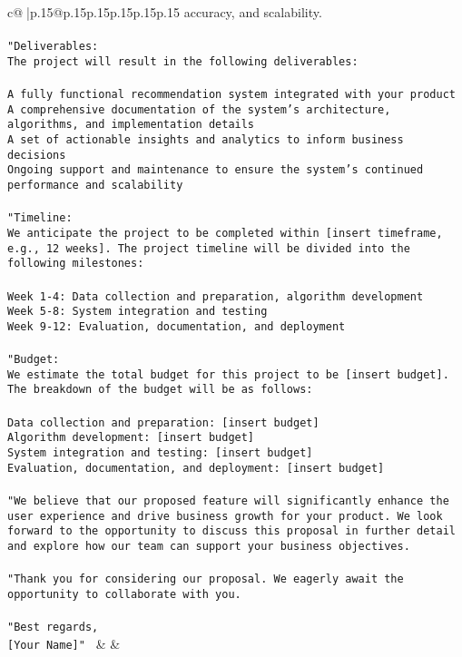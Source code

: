 \documentclass{article}
\begin{document}
{\begin{supertabular}{c@{$\;$}|p{.15\linewidth}@{}p{.15\linewidth}p{.15\linewidth}p{.15\linewidth}p{.15\linewidth}p{.15\linewidth}}
{{{accuracy, and scalability.\\ \tt \\ \tt "Deliverables:\\ \tt The project will result in the following deliverables:\\ \tt \\ \tt *   A fully functional recommendation system integrated with your product\\ \tt *   A comprehensive documentation of the system's architecture, algorithms, and implementation details\\ \tt *   A set of actionable insights and analytics to inform business decisions\\ \tt *   Ongoing support and maintenance to ensure the system's continued performance and scalability\\ \tt \\ \tt "Timeline:\\ \tt We anticipate the project to be completed within [insert timeframe, e.g., 12 weeks]. The project timeline will be divided into the following milestones:\\ \tt \\ \tt *   Week 1-4: Data collection and preparation, algorithm development\\ \tt *   Week 5-8: System integration and testing\\ \tt *   Week 9-12: Evaluation, documentation, and deployment\\ \tt \\ \tt "Budget:\\ \tt We estimate the total budget for this project to be [insert budget]. The breakdown of the budget will be as follows:\\ \tt \\ \tt *   Data collection and preparation: [insert budget]\\ \tt *   Algorithm development: [insert budget]\\ \tt *   System integration and testing: [insert budget]\\ \tt *   Evaluation, documentation, and deployment: [insert budget]\\ \tt \\ \tt "We believe that our proposed feature will significantly enhance the user experience and drive business growth for your product. We look forward to the opportunity to discuss this proposal in further detail and explore how our team can support your business objectives.\\ \tt \\ \tt "Thank you for considering our proposal. We eagerly await the opportunity to collaborate with you.\\ \tt \\ \tt "Best regards,\\ \tt [Your Name]" 
	  } 
	   } 
	   } 
	 & & \\ 
 


\end{supertabular}}
\end{document}

